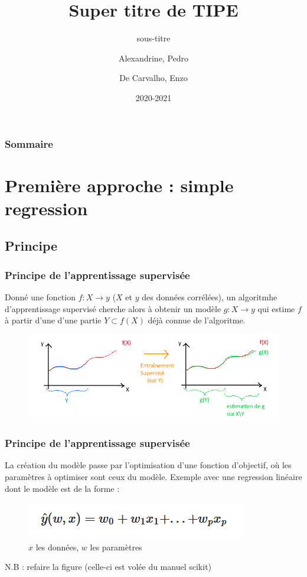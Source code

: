 \documentclass{beamer}
\title{Super titre de TIPE}
\subtitle{sous-titre}
\author{Alexandrine, Pedro\\\and De Carvalho, Enzo}
\date{2020-2021}
\begin{document}
\begin{frame}
	\maketitle
\end{frame}

\begin{frame}
	\frametitle{Sommaire}
	\tableofcontents
\end{frame}

\section{Première approche : simple regression}
\subsection{Principe}
\begin{frame}
	\frametitle{Principe de l'apprentissage supervisée}
	Donné une fonction $f : X \rightarrow y$ ($X$ et $y$ des données corrélées), un algoritmhe d'apprentissage supervisé cherche alors à obtenir un modèle $g : X \rightarrow y$ qui estime $f$ à partir d'une d'une partie $Y \subset f(X)$ déjà connue de l'algoritme.
	\begin{figure}[b]
		\centering
		\includegraphics[scale=0.65]{super_schema}
	\end{figure}
\end{frame}

\begin{frame}
	\frametitle{Principe de l'apprentissage supervisée}
	La création du modèle passe par l'optimisation d'une fonction d'objectif, où les paramètres à optimiser sont ceux du modèle.
	Exemple avec une regression linéaire dont le modèle est de la forme :
	\begin{figure}[h]
		\centering
		\includegraphics[scale=0.7]{f_lineair}
		\caption{$x$ les données, $w$ les paramètres}
	\end{figure}
	\alert{N.B : refaire la figure (celle-ci est volée du manuel scikit)}
\end{frame}
\end{document}
